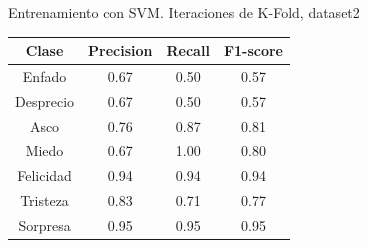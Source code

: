 \documentclass{beamer}
\begin{document}
\begin{frame}{Entrenamiento con SVM. Iteraciones de K-Fold, dataset2}
    \begin{table}[h!]
\begin{minipage}{0.48\linewidth}
\centering
\begin{adjustbox}{max width=\textwidth}
\begin{tabular}{|c|c|c|c|}
\hline
\textbf{Clase} & \textbf{Precision} & \textbf{Recall} & \textbf{F1-score}\\
\hline
     Enfado & 0.67 & 0.50 & 0.57\\
     Desprecio & 0.67 & 0.50 & 0.57\\
     Asco & 0.76 & 0.87 & 0.81\\
     Miedo & 0.67 & 1.00 & 0.80\\
     Felicidad & 0.94 & 0.94 & 0.94\\
     Tristeza & 0.83 & 0.71 & 0.77\\
     Sorpresa & 0.95 & 0.95 & 0.95\\
\hline
\end{tabular}
\end{adjustbox}
\vspace{0.4cm}


\end{minipage}
\end{table}
\end{frame}
\end{document}
